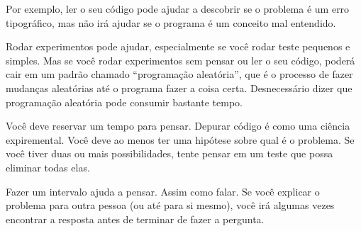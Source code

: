 
Por exemplo, ler o seu código pode ajudar a descobrir se o problema é um erro
tipográfico, mas não irá ajudar se o programa é um conceito mal entendido.


Rodar experimentos pode ajudar, especialmente se você rodar teste pequenos e
simples. Mas se você rodar experimentos sem pensar ou ler o seu código,
poderá cair em um padrão chamado ``programação aleatória'', que é o processo
de fazer mudanças aleatórias até o programa fazer a coisa certa.
Desnecessário dizer que programação aleatória pode consumir bastante tempo.


Você deve reservar um tempo para pensar. Depurar código é como uma ciência
expiremental. Você deve ao menos ter uma hipótese sobre qual é o problema.
Se você tiver duas ou mais possibilidades, tente pensar em um teste que possa
eliminar todas elas.

Fazer um intervalo ajuda a pensar. Assim como falar. Se você explicar o
problema para outra pessoa (ou até para si mesmo), você irá algumas vezes
encontrar a resposta antes de terminar de fazer a pergunta.

